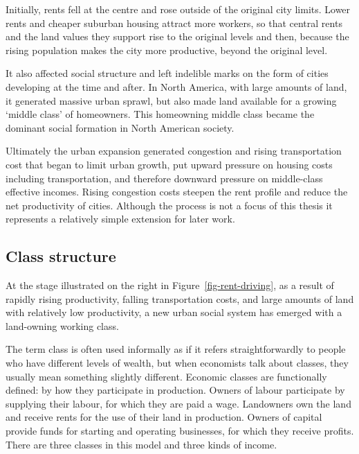 Initially, rents fell at the centre and rose outside of the original city limits. Lower rents and cheaper suburban housing attract more workers, so that central rents and the land values they support  rise to the original levels and then, because the rising population makes the city more productive, beyond the original level. 

It  also affected social structure and left indelible marks on the form of cities developing at the time and after. In North America, with large amounts of land, it generated massive urban sprawl, but also made land available for a growing `middle class' of homeowners. This homeowning middle class became the dominant social formation in North 
American society. 

Ultimately the urban expansion generated congestion and rising transportation cost that began to limit urban growth, put upward pressure on  housing costs including transportation, and therefore downward pressure on middle-class effective incomes. Rising congestion costs steepen the rent profile and  reduce the net productivity of cities. Although the process is not a focus of this thesis it represents a relatively simple extension for later work.

\subsection{Class structure} \label{section-class-structure}
At the stage illustrated on the right  in Figure~\ref{fig-rent-driving},  %
as a result of rapidly rising productivity, falling transportation costs, and large amounts of land with relatively low productivity, a new urban social system has emerged with a land-owning working class. 

The term \gls{class} is often used informally as if it refers straightforwardly to people who have different levels of wealth, but when economists talk about classes, they usually mean something slightly different. Economic classes are functionally defined:  by how they participate in production. Owners of labour participate by supplying their labour, for which they are paid a wage. Landowners own the land and receive rents for the use of their land in production. Owners of capital provide funds for starting and operating businesses, for which they receive profits.  There are three classes in this model and three kinds of income.  %

